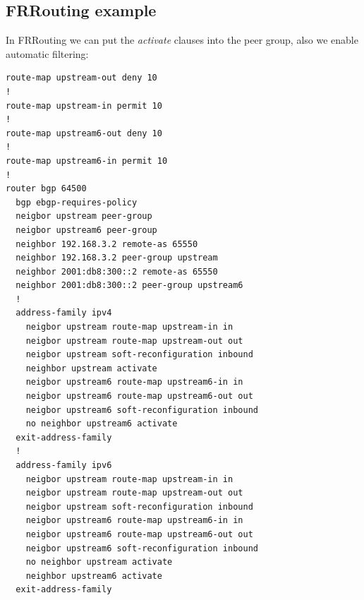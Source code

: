\subsection{FRRouting example}
In FRRouting we can put the \emph{activate} clauses into the peer group, also we enable  automatic filtering:
\begin{verbatim}
route-map upstream-out deny 10
!
route-map upstream-in permit 10
!
route-map upstream6-out deny 10
!
route-map upstream6-in permit 10
!
router bgp 64500
  bgp ebgp-requires-policy
  neigbor upstream peer-group
  neigbor upstream6 peer-group
  neighbor 192.168.3.2 remote-as 65550
  neighbor 192.168.3.2 peer-group upstream
  neighbor 2001:db8:300::2 remote-as 65550
  neighbor 2001:db8:300::2 peer-group upstream6
  !
  address-family ipv4
    neigbor upstream route-map upstream-in in
    neigbor upstream route-map upstream-out out
    neigbor upstream soft-reconfiguration inbound
    neighbor upstream activate
    neigbor upstream6 route-map upstream6-in in
    neigbor upstream6 route-map upstream6-out out
    neigbor upstream6 soft-reconfiguration inbound
    no neighbor upstream6 activate
  exit-address-family
  !
  address-family ipv6
    neigbor upstream route-map upstream-in in
    neigbor upstream route-map upstream-out out
    neigbor upstream soft-reconfiguration inbound
    neigbor upstream6 route-map upstream6-in in
    neigbor upstream6 route-map upstream6-out out
    neigbor upstream6 soft-reconfiguration inbound
    no neighbor upstream activate
    neighbor upstream6 activate
  exit-address-family
\end{verbatim}

